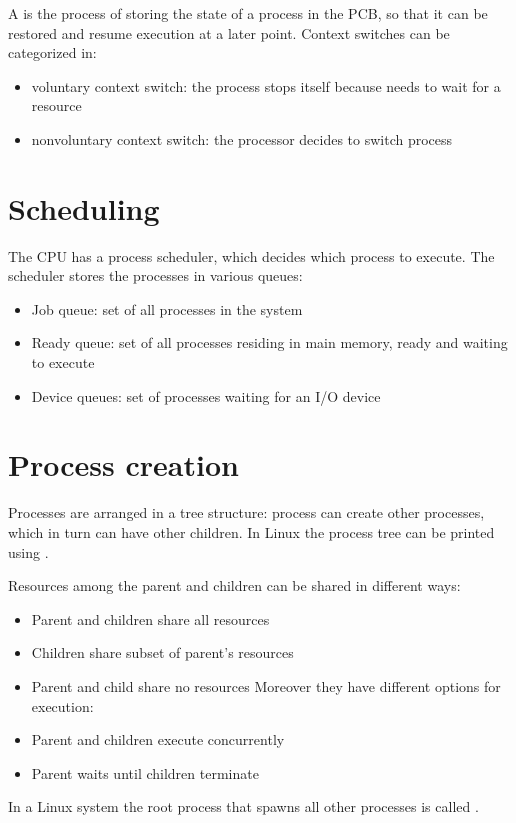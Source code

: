 A  is the process of storing the state of a process in the PCB, so that it can be restored and resume execution at a later point. Context switches can be categorized in:

\begin{itemize}
  \item voluntary context switch: the process stops itself because needs to wait for a resource
  \item nonvoluntary context switch: the processor decides to switch process
\end{itemize}

\section{Scheduling}
The CPU has a process scheduler, which decides which process to execute. The scheduler stores the processes in various queues:

\begin{itemize}
  \item Job queue: set of all processes in the system
  \item Ready queue: set of all processes residing in main memory, ready and waiting to execute
  \item Device queues: set of processes waiting for an I/O device
\end{itemize}


\section{Process creation}
Processes are arranged in a tree structure: process can create other  processes, which in turn can have other children. In Linux the process tree can be printed using .

Resources among the parent and children can be shared in different ways:
\begin{itemize}
  \item Parent and children share all resources
  \item Children share subset of parent's resources
  \item Parent and child share no resources
  Moreover they have different options for execution:
  \item Parent and children execute concurrently
  \item Parent waits until children terminate
\end{itemize}
In a Linux system the root process that spawns all other processes is called .

